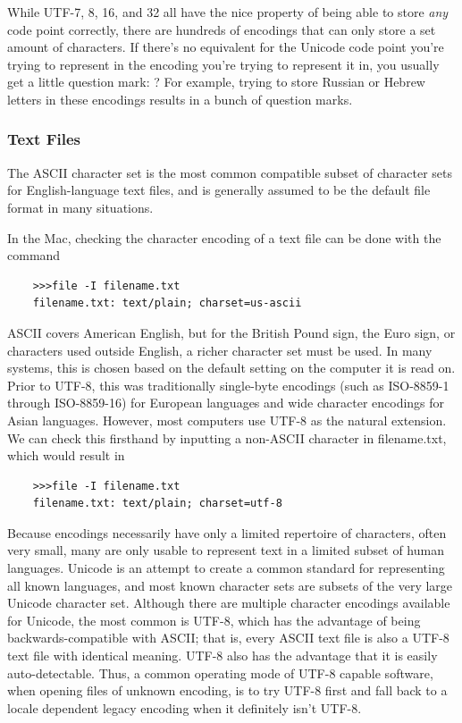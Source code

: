     While UTF-7, 8, 16, and 32 all have the nice property of being able to store \textit{any} code point correctly, there are hundreds of encodings that can only store a set amount of characters. If there’s no equivalent for the Unicode code point you’re trying to represent in the encoding you’re trying to represent it in, you usually get a little question mark: ? For example, trying to store Russian or Hebrew letters in these encodings results in a bunch of question marks. 

  \subsubsection{Text Files}

    The ASCII character set is the most common compatible subset of character sets for English-language text files, and is generally assumed to be the default file format in many situations. 

    In the Mac, checking the character encoding of a text file can be done with the command 
    \begin{lstlisting}
    >>>file -I filename.txt
    filename.txt: text/plain; charset=us-ascii
    \end{lstlisting}
    ASCII covers American English, but for the British Pound sign, the Euro sign, or characters used outside English, a richer character set must be used. In many systems, this is chosen based on the default setting on the computer it is read on. Prior to UTF-8, this was traditionally single-byte encodings (such as ISO-8859-1 through ISO-8859-16) for European languages and wide character encodings for Asian languages. However, most computers use UTF-8 as the natural extension. We can check this firsthand by inputting a non-ASCII character in filename.txt, which would result in
    \begin{lstlisting}
    >>>file -I filename.txt
    filename.txt: text/plain; charset=utf-8
    \end{lstlisting}
    Because encodings necessarily have only a limited repertoire of characters, often very small, many are only usable to represent text in a limited subset of human languages. Unicode is an attempt to create a common standard for representing all known languages, and most known character sets are subsets of the very large Unicode character set. Although there are multiple character encodings available for Unicode, the most common is UTF-8, which has the advantage of being backwards-compatible with ASCII; that is, every ASCII text file is also a UTF-8 text file with identical meaning. UTF-8 also has the advantage that it is easily auto-detectable. Thus, a common operating mode of UTF-8 capable software, when opening files of unknown encoding, is to try UTF-8 first and fall back to a locale dependent legacy encoding when it definitely isn't UTF-8.

